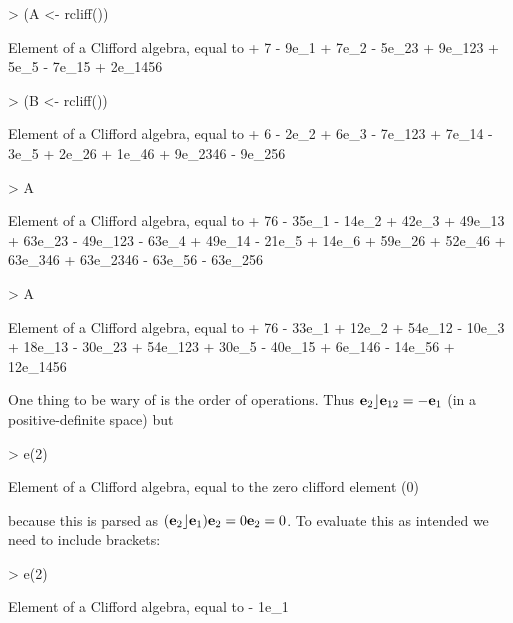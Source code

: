 \documentclass{birkjour}
\theoremstyle{definition}
\theoremstyle{remark}
\numberwithin{equation}{section}
\begin{document}
\begin{Schunk}
\begin{Sinput}
> (A <- rcliff())
\end{Sinput}
\begin{Soutput}
Element of a Clifford algebra, equal to
+ 7 - 9e_1 + 7e_2 - 5e_23 + 9e_123 + 5e_5 - 7e_15 + 2e_1456
\end{Soutput}
\begin{Sinput}
> (B <- rcliff())
\end{Sinput}
\begin{Soutput}
Element of a Clifford algebra, equal to
+ 6 - 2e_2 + 6e_3 - 7e_123 + 7e_14 - 3e_5 + 2e_26 + 1e_46 + 9e_2346 - 9e_256
\end{Soutput}
\begin{Sinput}
> A %
\end{Sinput}
\begin{Soutput}
Element of a Clifford algebra, equal to
+ 76 - 35e_1 - 14e_2 + 42e_3 + 49e_13 + 63e_23 - 49e_123 - 63e_4 + 49e_14 -
21e_5 + 14e_6 + 59e_26 + 52e_46 + 63e_346 + 63e_2346 - 63e_56 - 63e_256
\end{Soutput}
\begin{Sinput}
> A %
\end{Sinput}
\begin{Soutput}
Element of a Clifford algebra, equal to
+ 76 - 33e_1 + 12e_2 + 54e_12 - 10e_3 + 18e_13 - 30e_23 + 54e_123 + 30e_5 -
40e_15 + 6e_146 - 14e_56 + 12e_1456
\end{Soutput}
\end{Schunk}

One thing to be wary of is the order of operations.  Thus
${\bf e}_{2}\rfloor{\bf e}_{12}=-{\bf e}_{1}$ (in a positive-definite space) but

\begin{Schunk}
\begin{Sinput}
> e(2) %
\end{Sinput}
\begin{Soutput}
Element of a Clifford algebra, equal to
the zero clifford element (0)
\end{Soutput}
\end{Schunk}

because this is parsed as $({\bf e}_{2}\rfloor{\bf e}_{1}){\bf e}_{2}=0{\bf e}_{2}=0$.  To
evaluate this as intended we need to include brackets:

\begin{Schunk}
\begin{Sinput}
> e(2) %
\end{Sinput}
\begin{Soutput}
Element of a Clifford algebra, equal to
- 1e_1
\end{Soutput}
\end{Schunk}
\end{document}
